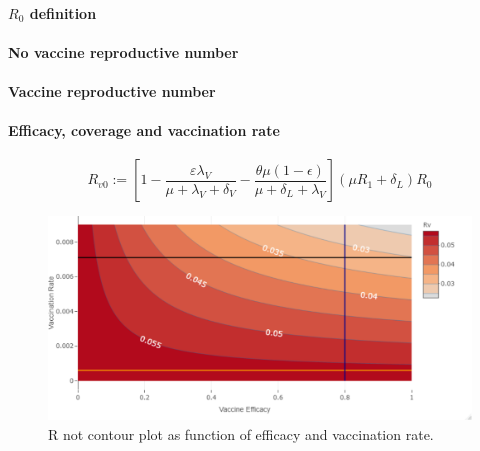 \paragraph{$R_0$ definition}
\paragraph{No  vaccine reproductive number}
\paragraph{Vaccine reproductive number}
\paragraph{Efficacy, coverage and vaccination rate}

%

\begin{equation*}
 R_{v0} := \left[ 1-\frac{\varepsilon \lambda_V}
 {\mu+\lambda_V+\delta_V}
 -\frac{\theta\mu(1-\epsilon)}{\mu+\delta_L+\lambda_V}\right]
 (\mu R_1+\delta_L)R_0
\end{equation*}
%
\begin{figure}[tbh]
    \centering
    \includegraphics[scale=0.565, keepaspectratio]{Figures/Rv_contour}
    \caption{R not contour plot as function of efficacy and vaccination rate.}
    \label{fig:rvcontour1}
\end{figure}



